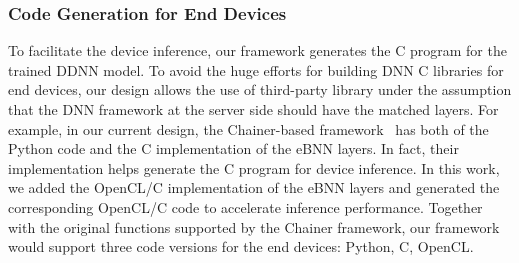 \documentclass[conference]{IEEEtran}
\begin{document}
\subsubsection{Code Generation for End Devices}
To facilitate the device inference, our framework generates the C program for the trained DDNN model. To avoid the huge efforts for building DNN C libraries for end devices, our design allows the use of third-party library under the assumption that the DNN framework at the server side should have the matched layers. For example, in our current design, the Chainer-based framework~\cite{Teerapittayanon17} has both of the Python code and the C implementation of the eBNN layers. In fact, their implementation helps generate the C program for device inference. In this work, we added the OpenCL/C implementation of the eBNN layers and generated the corresponding OpenCL/C code to accelerate inference performance. Together with the original functions supported by the Chainer framework, our framework would support three code versions for the end devices: Python, C, OpenCL.

%

\end{document}
